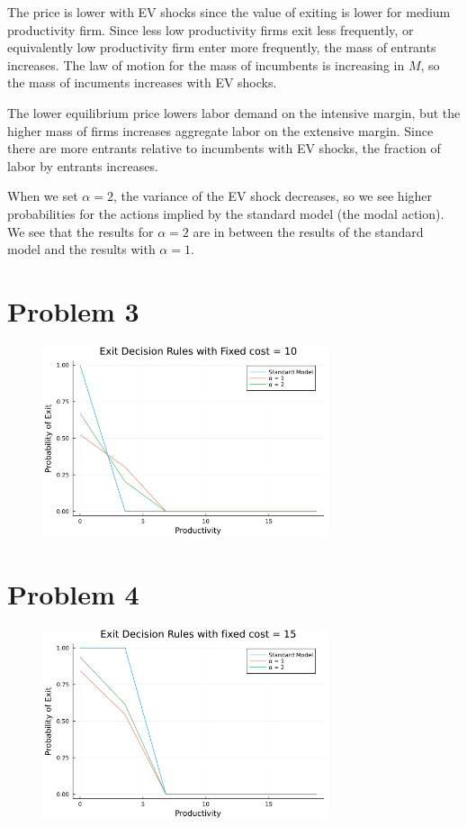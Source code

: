 \documentclass[10pt]{article}
\begin{document}
The price is lower with EV shocks since the value of exiting is lower for medium productivity firm.  Since less low productivity firms exit less frequently, or equivalently low productivity firm enter more frequently, the mass of entrants increases. The law of motion for the mass of 
incumbents is increasing in $M$, so the mass of incuments increases with EV shocks. 

The lower equilibrium price lowers labor demand on the intensive margin, but the higher mass of firms increases aggregate labor on the extensive margin. 
Since there are more entrants relative to incumbents with EV shocks, the fraction of labor by entrants increases. 

When we set $\alpha = 2$, the variance of the EV shock decreases, so we see higher probabilities for the actions implied by the standard model (the modal action). We see that the results for 
$\alpha = 2$ are in between the results of the standard model and the results with $\alpha = 1$. 


    \section{Problem 3}

    \begin{figure}[!h]
        \centering
        \includegraphics*[width = 0.75\textwidth]{exit_rule_c_f_10.png}
    \end{figure}

\newpage 
    \section{Problem 4}
    \begin{figure}[!h]
        \centering
        \includegraphics*[width = 0.75\textwidth]{exit_rule_c_f_15.png}
    \end{figure}
\end{document}
